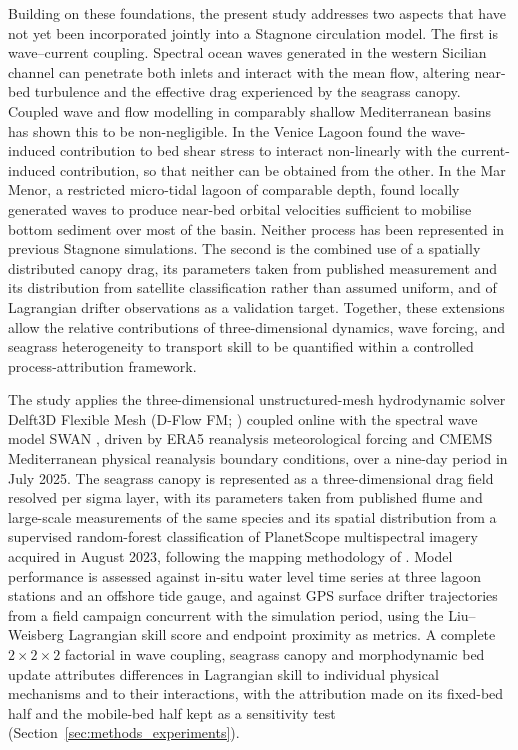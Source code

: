 Building on these foundations, the present study addresses two aspects that
have not yet been incorporated jointly into a Stagnone circulation model. The
first is wave--current coupling. Spectral ocean waves generated in the western
Sicilian channel can penetrate both inlets and interact with the mean flow,
altering near-bed turbulence and the effective drag experienced by the
seagrass canopy. Coupled wave and flow modelling in comparably shallow
Mediterranean basins has shown this to be non-negligible. In the Venice Lagoon
\citet{Carniello2011} found the wave-induced contribution to bed shear stress
to interact non-linearly with the current-induced contribution, so that neither
can be obtained from the other. In the Mar Menor, a restricted micro-tidal
lagoon of comparable depth, \citet{Morote2025} found locally generated waves to
produce near-bed orbital velocities sufficient to mobilise bottom sediment over
most of the basin. Neither process has been represented in previous Stagnone
simulations. The second is the combined use of a spatially distributed canopy
drag, its parameters taken from published measurement and its distribution from
satellite classification rather than assumed uniform, and of Lagrangian drifter
observations as a validation target. Together, these extensions allow the
relative contributions of three-dimensional dynamics, wave forcing, and
seagrass heterogeneity to transport skill to be quantified within a controlled
process-attribution framework.

The study applies the three-dimensional unstructured-mesh hydrodynamic solver Delft3D
Flexible Mesh (D-Flow FM; \citealp{Kernkamp2011}) coupled online with the
spectral wave model SWAN \citep{Booij1999}, driven by ERA5 reanalysis
meteorological forcing and CMEMS Mediterranean physical reanalysis boundary
conditions, over a nine-day period in July 2025. The seagrass canopy is
represented as a three-dimensional drag field resolved per sigma layer, with
its parameters taken from published flume and large-scale measurements of the
same species and its spatial distribution from a supervised random-forest
classification of PlanetScope multispectral imagery acquired in August 2023,
following the mapping methodology of \citet{Maltese2025}. Model performance is assessed against in-situ water level
time series at three lagoon stations and an offshore tide gauge, and against
GPS surface drifter trajectories from a field campaign concurrent with the
simulation period, using the Liu--Weisberg Lagrangian skill score and endpoint
proximity as metrics. A complete $2\times2\times2$ factorial in wave coupling,
seagrass canopy and morphodynamic bed update attributes differences in
Lagrangian skill to individual physical mechanisms and to their interactions,
with the attribution made on its fixed-bed half and the mobile-bed half kept as
a sensitivity test (Section~\ref{sec:methods_experiments}).

